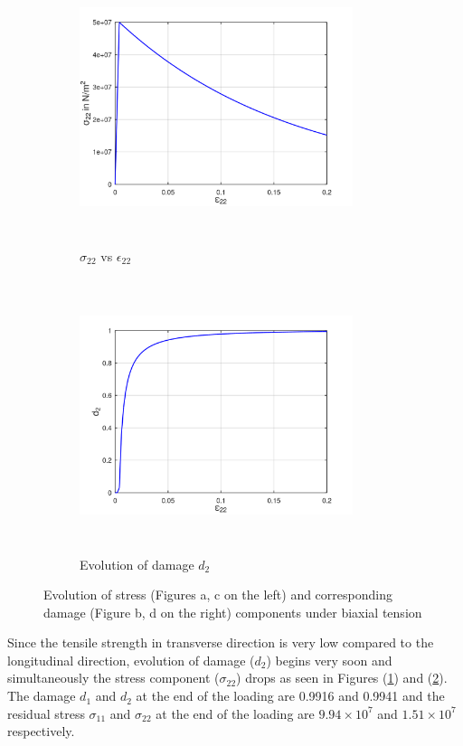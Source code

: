 \documentclass[12pt,a4paper,twoside,openright]{report}
\begin{document}
\FloatBarrier
\begin{figure}[htbp!]\ContinuedFloat 
     \begin{subfigure}{0.4\textwidth}
         \includegraphics[width=8cm,height=8cm,keepaspectratio]{23.S22vsE22.png}
         \caption{$\sigma_{22}$ vs $\epsilon_{22}$}
         \label{fig:S22vsE22}
     \end{subfigure}
     \hspace{1.8cm}
     \begin{subfigure}{0.4\textwidth}
         \centering
         \includegraphics[width=8cm,height=8cm,keepaspectratio]{23.d2.png}
         \caption{Evolution of damage $d_{2}$}
         \label{fig:Evolution of damage d2}
     \end{subfigure}
    
        \caption{Evolution of stress (Figures a, c on the left) and corresponding damage (Figure b, d on the right) components under biaxial tension}
        \label{fig:Evolution of damage under biaxial tension}     
\end{figure} 
\FloatBarrier
Since the tensile strength in transverse direction is very low compared to the longitudinal direction, evolution of damage ($d_{2}$) begins very soon and simultaneously the stress component ($\sigma_{22}$) drops as seen in Figures (\ref{fig:S22vsE22}) and (\ref{fig:Evolution of damage d2}). The damage $d_{1}$ and $d_{2}$ at the end of the loading are 0.9916 and 0.9941 and the residual stress $\sigma_{11}$ and $\sigma_{22}$ at the end of the loading are $9.94\times10^{7}$ and $1.51\times10^{7}$ respectively.
\end{document}
